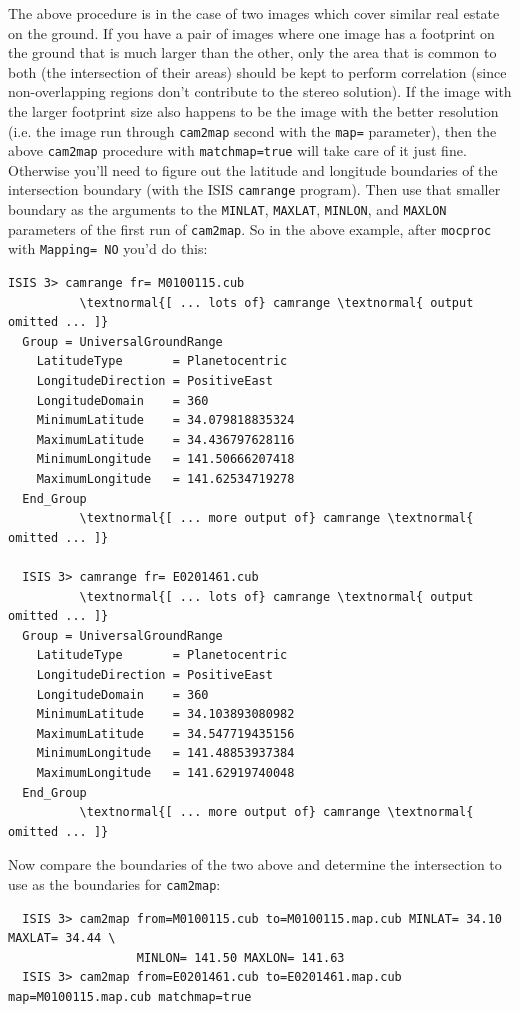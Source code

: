 The above procedure is in the case of two images which cover similar
real estate on the ground.  If you have a pair of images where one
image has a footprint on the ground that is much larger than the
other, only the area that is common to both (the intersection of their
areas) should be kept to perform correlation (since non-overlapping
regions don't contribute to the stereo solution).  If the image with
the larger footprint size also happens to be the image with the better
resolution (i.e. the image run through \texttt{cam2map} second with
the \texttt{map=} parameter), then the above \texttt{cam2map}
procedure with \texttt{matchmap=true} will take care of it just fine.
Otherwise you'll need to figure out the latitude and longitude
boundaries of the intersection boundary (with the \ac{ISIS}
\texttt{camrange} program).  Then use that smaller boundary as the
arguments to the \texttt{MINLAT}, \texttt{MAXLAT}, \texttt{MINLON},
and \texttt{MAXLON} parameters of the first run of \texttt{cam2map}.
So in the above example, after \texttt{mocproc} with \texttt{Mapping=
  NO} you'd do this:

\begin{Verbatim}[commandchars=\\\{\}]
  ISIS 3> camrange fr= M0100115.cub
          \textnormal{[ ... lots of} camrange \textnormal{ output omitted ... ]}
  Group = UniversalGroundRange
    LatitudeType       = Planetocentric
    LongitudeDirection = PositiveEast
    LongitudeDomain    = 360
    MinimumLatitude    = 34.079818835324
    MaximumLatitude    = 34.436797628116
    MinimumLongitude   = 141.50666207418
    MaximumLongitude   = 141.62534719278
  End_Group
          \textnormal{[ ... more output of} camrange \textnormal{ omitted ... ]}

  ISIS 3> camrange fr= E0201461.cub
          \textnormal{[ ... lots of} camrange \textnormal{ output omitted ... ]}
  Group = UniversalGroundRange
    LatitudeType       = Planetocentric
    LongitudeDirection = PositiveEast
    LongitudeDomain    = 360
    MinimumLatitude    = 34.103893080982
    MaximumLatitude    = 34.547719435156
    MinimumLongitude   = 141.48853937384
    MaximumLongitude   = 141.62919740048
  End_Group
          \textnormal{[ ... more output of} camrange \textnormal{ omitted ... ]}
\end{Verbatim}

Now compare the boundaries of the two above and determine the intersection to use as the boundaries for \texttt{cam2map}:

\begin{Verbatim}
  ISIS 3> cam2map from=M0100115.cub to=M0100115.map.cub MINLAT= 34.10 MAXLAT= 34.44 \
                  MINLON= 141.50 MAXLON= 141.63
  ISIS 3> cam2map from=E0201461.cub to=E0201461.map.cub map=M0100115.map.cub matchmap=true
\end{Verbatim}

